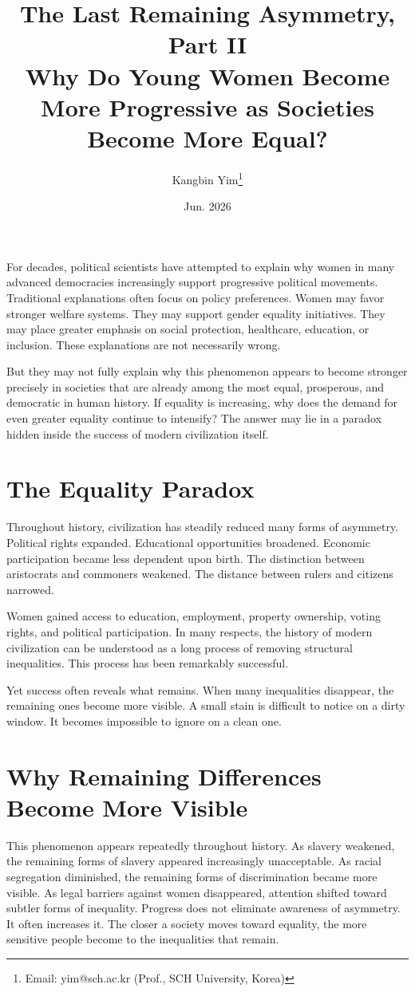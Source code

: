\documentclass[12pt]{article}
\title{The Last Remaining Asymmetry, Part II\\
Why Do Young Women Become More Progressive as Societies Become More Equal?}
\author{Kangbin Yim\thanks{Email: yim@sch.ac.kr (Prof., SCH University, Korea)}}
\date{Jun. 2026}
\begin{document}
\maketitle

For decades, political scientists have attempted to explain why women in many advanced democracies increasingly support progressive political movements. Traditional explanations often focus on policy preferences. Women may favor stronger welfare systems. They may support gender equality initiatives.
They may place greater emphasis on social protection, healthcare, education, or inclusion. These explanations are not necessarily wrong.

But they may not fully explain why this phenomenon appears to become stronger precisely in societies that are already among the most equal, prosperous, and democratic in human history. If equality is increasing, why does the demand for even greater equality continue to intensify? The answer may lie in a paradox hidden inside the success of modern civilization itself.

\section*{The Equality Paradox}

Throughout history, civilization has steadily reduced many forms of asymmetry.
Political rights expanded. Educational opportunities broadened. Economic participation became less dependent upon birth. The distinction between aristocrats and commoners weakened. The distance between rulers and citizens narrowed.

Women gained access to education, employment, property ownership, voting rights, and political participation. In many respects, the history of modern civilization can be understood as a long process of removing structural inequalities. This process has been remarkably successful.

Yet success often reveals what remains. When many inequalities disappear, the remaining ones become more visible. A small stain is difficult to notice on a dirty window. It becomes impossible to ignore on a clean one.

\section*{Why Remaining Differences Become More Visible}

This phenomenon appears repeatedly throughout history. As slavery weakened, the remaining forms of slavery appeared increasingly unacceptable. As racial segregation diminished, the remaining forms of discrimination became more visible. As legal barriers against women disappeared, attention shifted toward subtler forms of inequality. Progress does not eliminate awareness of asymmetry.
It often increases it. The closer a society moves toward equality, the more sensitive people become to the inequalities that remain.
\end{document}
